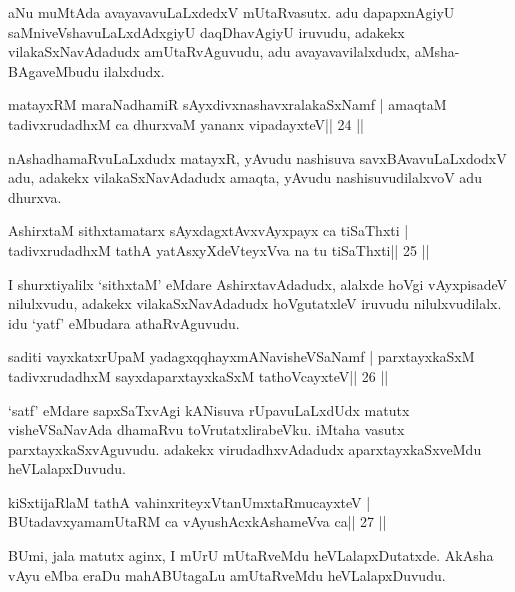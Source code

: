 \begin{artha}
aNu muMtAda avayavavuLaLxdedxV mUtaRvasutx. adu dapapxnAgiyU saMniveVshavuLaLxdAdxgiyU daqDhavAgiyU iruvudu, adakekx vilakaSxNavAdadudx amUtaRvAguvudu, adu avayavavilalxdudx, aMsha-BAgaveMbudu ilalxdudx.
\end{artha}



\begin{shl}
matayxRM maraNadhamiR sAyxdivxnashavxralakaSxNamf |
amaqtaM tadivxrudadhxM ca dhurxvaM yananx vipadayxteV\hfill || 24 ||
\end{shl}

\begin{artha}
nAshadhamaRvuLaLxdudx matayxR, yAvudu nashisuva savxBAvavuLaLxdodxV
adu, adakekx vilakaSxNavAdadudx amaqta, yAvudu nashisuvudilalxvoV adu dhurxva.
\end{artha}

\begin{shl}
AshirxtaM sithxtamatarx sAyxdagxtAvx\s vAyxpayx ca tiSaThxti |
tadivxrudadhxM tathA yatAsxyXdeVteyxVva na tu tiSaThxti\hfill || 25 ||
\end{shl}

\begin{artha}
I shurxtiyalilx `sithxtaM' eMdare AshirxtavAdadudx, alalxde hoVgi
vAyxpisadeV nilulxvudu, adakekx vilakaSxNavAdadudx hoVgutatxleV
iruvudu nilulxvudilalx. idu `yatf' eMbudara athaRvAguvudu.
\end{artha}

\begin{shl}
saditi vayxkatxrUpaM yadagxqqhayxmANavisheVSaNamf |
parxtayxkaSxM tadivxrudadhxM sayxdaparxtayxkaSxM tathoVcayxteV\hfill || 26 ||
\end{shl}

\begin{artha}
`satf' eMdare sapxSaTxvAgi kANisuva rUpavuLaLxdUdx matutx visheVSaNavAda dhamaRvu toVrutatxlirabeVku. iMtaha vasutx parxtayxkaSxvAguvudu. adakekx virudadhxvAdadudx aparxtayxkaSxveMdu heVLalapxDuvudu.
\end{artha}

\begin{shl}
kiSxtijaRlaM tathA vahinxriteyxVtanUmxtaRmucayxteV |
BUtadavxyamamUtaRM ca vAyushAcx\s\s kAshameVva ca\hfill || 27 ||
\end{shl}

\begin{artha}
BUmi, jala matutx aginx, I mUrU mUtaRveMdu heVLalapxDutatxde. AkAsha vAyu eMba eraDu mahABUtagaLu amUtaRveMdu heVLalapxDuvudu.
\end{artha}

